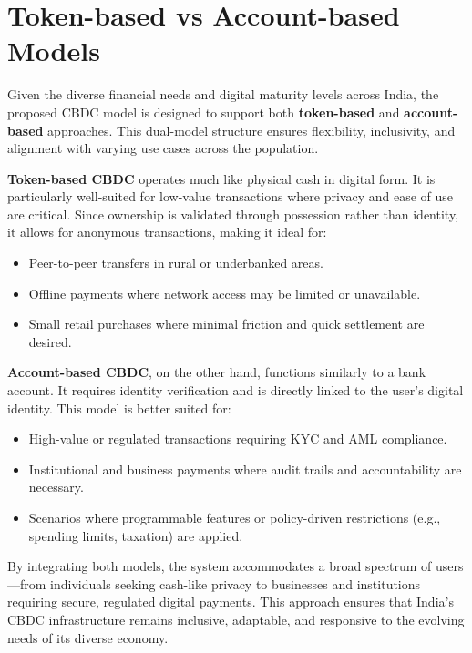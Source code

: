 \section{Token-based vs Account-based Models}

Given the diverse financial needs and digital maturity levels across India, the proposed CBDC model is designed to support both \textbf{token-based} and \textbf{account-based} approaches. This dual-model structure ensures flexibility, inclusivity, and alignment with varying use cases across the population.

\textbf{Token-based CBDC} operates much like physical cash in digital form. It is particularly well-suited for low-value transactions where privacy and ease of use are critical. Since ownership is validated through possession rather than identity, it allows for anonymous transactions, making it ideal for:

\begin{itemize}
    \item Peer-to-peer transfers in rural or underbanked areas.
    \item Offline payments where network access may be limited or unavailable.
    \item Small retail purchases where minimal friction and quick settlement are desired.
\end{itemize}

\textbf{Account-based CBDC}, on the other hand, functions similarly to a bank account. It requires identity verification and is directly linked to the user’s digital identity. This model is better suited for:

\begin{itemize}
    \item High-value or regulated transactions requiring KYC and AML compliance.
    \item Institutional and business payments where audit trails and accountability are necessary.
    \item Scenarios where programmable features or policy-driven restrictions (e.g., spending limits, taxation) are applied.
\end{itemize}

By integrating both models, the system accommodates a broad spectrum of users—from individuals seeking cash-like privacy to businesses and institutions requiring secure, regulated digital payments. This approach ensures that India's CBDC infrastructure remains inclusive, adaptable, and responsive to the evolving needs of its diverse economy.

